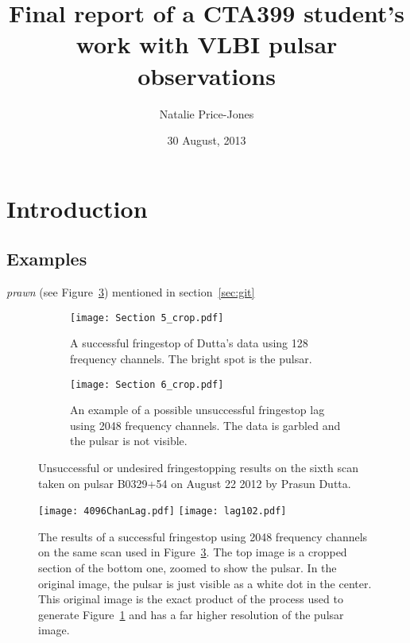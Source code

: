 \documentclass[a4paper,12pt]{article}
\begin{document}
\onehalfspacing
\title{Final report of a CTA399 student's work with VLBI pulsar observations}
\author{Natalie Price-Jones}
\date{30 August, 2013}
\maketitle

\begin{abstract}
\label{abstract}

\end{abstract}

\section{Introduction}
\label{sec:introduction}

\subsection{Examples}
\label{sec:ex}

\citep{millisecondpulsar}
\emph{prawn}
(see Figure~\ref{fig:failedFS})
mentioned in section~\ref{sec:git}

\begin{figure}
\centering
\begin{subfigure}{0.5\textwidth}
  \centering
  \texttt{[image: Section 5\_crop.pdf]}
  \caption{A successful fringestop of Dutta's data using 128 frequency channels. The bright spot is the pulsar.}
  \label{fig:sub1}
\end{subfigure}%
\begin{subfigure}{0.5\textwidth}
  \centering
  \texttt{[image: Section 6\_crop.pdf]}
  \caption{An example of a possible unsuccessful fringestop lag using 2048 frequency channels. The data is garbled and the pulsar is not visible.}
  \label{fig:sub2}
\end{subfigure}
\caption{Unsuccessful or undesired fringestopping results on the sixth scan taken on pulsar B0329+54 on August 22 2012 by Prasun Dutta.}
\label{fig:failedFS}
\end{figure}

\begin{figure}
\centering
\texttt{[image: 4096ChanLag.pdf]}
\texttt{[image: lag102.pdf]}
\caption{The results of a successful fringestop using 2048 frequency channels on the same scan used in Figure~\ref{fig:failedFS}. The top image is a cropped section of the bottom one, zoomed to show the pulsar. In the original image, the pulsar is just visible as a white dot in the center. This original image is the exact product of the process used to generate Figure~\ref{fig:sub1} and has a far higher resolution of the pulsar image.}
\label{fig:successfulFS}
\end{figure}
\end{document}
